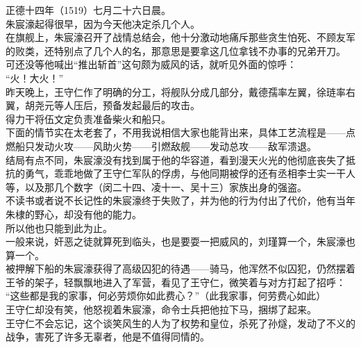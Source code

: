 \begin{multicols}{\theparacolNo}
正德十四年（1519）七月二十六日晨。\\

朱宸濠起得很早，因为今天他决定杀几个人。\\

在旗舰上，朱宸濠召开了战情总结会，他十分激动地痛斥那些贪生怕死、不顾友军的败类，还特别点了几个人的名，那意思是要拿这几位拿钱不办事的兄弟开刀。\\

可还没等他喊出“推出斩首”这句颇为威风的话，就听见外面的惊呼：\\

“火！大火！”\\

昨天晚上，王守仁作了明确的分工，将舰队分成几部分，戴德孺率左翼，徐琏率右翼，胡尧元等人压后，预备发起最后的攻击。\\

得力干将伍文定负责准备柴火和船只。\\

下面的情节实在太老套了，不用我说相信大家也能背出来，具体工艺流程是——点燃船只发动火攻——风助火势——引燃敌舰——发动总攻——敌军溃退。\\

结局有点不同，朱宸濠没有找到属于他的华容道，看到漫天火光的他彻底丧失了抵抗的勇气，乖乖地做了王守仁军队的俘虏，与他同期被俘的还有丞相李士实一干人等，以及那几个数字（闵二十四、凌十一、吴十三）家族出身的强盗。\\

不读书或者说不长记性的朱宸濠终于失败了，并为他的行为付出了代价，他有当年朱棣的野心，却没有他的能力。\\

所以他也只能到此为止。\\

一般来说，奸恶之徒就算死到临头，也是要耍一把威风的，刘瑾算一个，朱宸濠也算一个。\\

被押解下船的朱宸濠获得了高级囚犯的待遇——骑马，他浑然不似囚犯，仍然摆着王爷的架子，轻飘飘地进入了军营，看见了王守仁，微笑着与对方打起了招呼：\\

“这些都是我的家事，何必劳烦你如此费心？”（此我家事，何劳费心如此）\\

王守仁却没有笑，他怒视着朱宸濠，命令士兵把他拉下马，捆绑了起来。\\

王守仁不会忘记，这个谈笑风生的人为了权势和皇位，杀死了孙燧，发动了不义的战争，害死了许多无辜者，他是不值得同情的。\\


\end{multicols}
